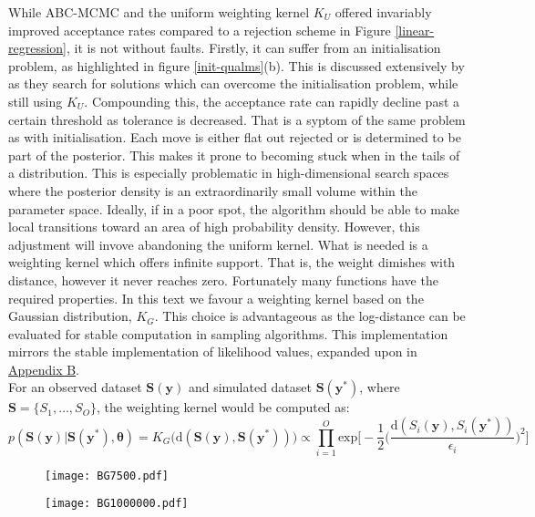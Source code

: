 While ABC-MCMC and the uniform weighting kernel $K_U$ offered invariably improved acceptance rates compared to a rejection scheme in Figure \ref{linear-regression}, it is not without faults. Firstly, it can suffer from an initialisation problem, as highlighted in figure \ref{init-qualms}(b). This is discussed extensively by \citep{Sisson2010a} as they search for solutions which can overcome the initialisation problem, while still using $K_U$. Compounding this, the acceptance rate can rapidly decline past a certain threshold as tolerance is decreased. That is a syptom of the same problem as with initialisation. Each move is either flat out rejected or is determined to be part of the posterior. This makes it prone to becoming stuck when in the tails of a distribution. This is especially problematic in high-dimensional search spaces where the posterior density is an extraordinarily small volume within the parameter space. Ideally, if in a poor spot, the algorithm should be able to make local transitions toward an area of high probability density. However, this adjustment will invove abandoning the uniform kernel. What is needed is a weighting kernel which offers infinite support. That is, the weight dimishes with distance, however it never reaches zero. Fortunately many functions have the required properties. In this text we favour a  weighting kernel based on the Gaussian distribution, $K_G$. This choice is advantageous as the log-distance can be evaluated for stable computation in sampling algorithms. This implementation mirrors the stable implementation of likelihood values, expanded upon in \hyperref[AppendixB]{Appendix B}.\\

For an observed dataset $\bm{S}(\bm{y})$ and simulated dataset $\bm{S}(\bm{y^*})$, where $\bm{S} = \{S_1,\dots,S_O\}$, the weighting kernel would be computed as:
\begin{equation}
p(\bm{S}(\bm{y})|\bm{S}(\bm{y^*}),\bm{\theta}) = K_G\big(\text{d}(\bm{S}(\bm{y}),\bm{S}(\bm{y^*}))\big) \propto \prod_{i = 1}^{O} \text{exp}\Big[-\frac{1}{2}\Big(\frac{\text{d}(S_i(\bm{y}),S_i(\bm{y^*}))}{\epsilon_i}\Big)^2\Big]
\end{equation}

\begin{figure}[H]
	\centering
	\texttt{[image: BG7500.pdf]}
	\caption{}
\end{figure}

\begin{figure}[H]
	\centering
	\texttt{[image: BG1000000.pdf]}
	\caption{}
\end{figure}



